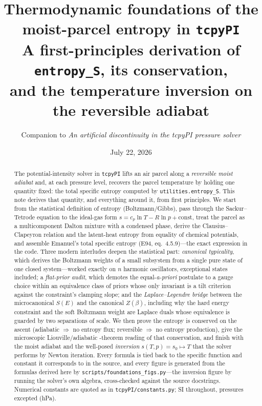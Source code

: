 \documentclass[11pt,a4paper]{article}
\title{Thermodynamic foundations of the moist-parcel entropy in \texttt{tcpyPI}\\
\large A first-principles derivation of \texttt{entropy\_S}, its conservation,\\
and the temperature inversion on the reversible adiabat}
\author{Companion to \emph{An artificial discontinuity in the tcpyPI pressure solver}}
\date{July 22, 2026}
\theoremstyle{definition}
\begin{document}
\maketitle

\begin{abstract}
\noindent
The potential-intensity solver in \texttt{tcpyPI} lifts an air parcel along a
\emph{reversible moist adiabat} and, at each pressure level, recovers the
parcel temperature by holding one quantity fixed: the total specific entropy
computed by \texttt{utilities.entropy\_S}. This note derives that quantity, and
everything around it, from first principles. We start from the statistical
definition of entropy (Boltzmann/Gibbs), pass through the Sackur--Tetrode
equation to the ideal-gas form $s=c_p\ln T-R\ln p+\mathrm{const}$, treat the
parcel as a multicomponent Dalton mixture with a condensed phase, derive the
Clausius--Clapeyron relation and the latent-heat entropy from equality of
chemical potentials, and assemble Emanuel's total specific entropy
(E94, eq.~4.5.9)---the exact expression in the code. Three modern interludes
deepen the statistical part: \emph{canonical typicality}, which derives the
Boltzmann weights of a small subsystem from a single pure state of one closed
system---worked exactly on $n$ harmonic oscillators, exceptional states
included; a \emph{flat-prior audit}, which demotes the equal-\emph{a-priori}
postulate to a gauge choice within an equivalence class of priors whose only
invariant is a tilt criterion against the constraint's clamping slope; and the
\emph{Laplace--Legendre bridge} between the microcanonical
$S(E)$ and the canonical $Z(\beta)$, including why the hard energy constraint
and the soft Boltzmann weight are Laplace duals whose equivalence is guarded by
two separations of scale. We then prove the entropy is
conserved on the ascent (adiabatic $\Rightarrow$ no entropy flux; reversible
$\Rightarrow$ no entropy production), give the microscopic Liouville/adiabatic
-theorem reading of that conservation, and finish with the moist adiabat and
the well-posed \emph{inversion} $s(T,p)=s_0\mapsto T$ that the solver performs
by Newton iteration. Every formula is tied back to the specific function and
constant it corresponds to in the source, and every figure is generated from
the formulas derived here by \texttt{scripts/foundations\_figs.py}---the
inversion figure by running the solver's own algebra, cross-checked against the
source docstrings. Numerical constants are quoted as in
\texttt{tcpyPI/constants.py}; SI throughout, pressures excepted (hPa).
\end{abstract}
\end{document}
